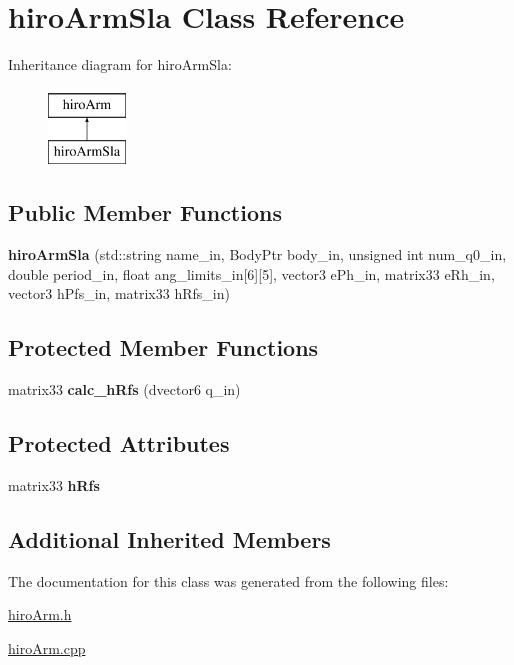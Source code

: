 \hypertarget{classhiroArmSla}{\section{hiro\-Arm\-Sla Class Reference}
\label{classhiroArmSla}
}
Inheritance diagram for hiro\-Arm\-Sla\-:\begin{figure}[H]
\begin{center}
\leavevmode
\includegraphics[height=2.000000cm]{classhiroArmSla}
\end{center}
\end{figure}
\subsection*{Public Member Functions}
\begin{DoxyCompactItemize}
\item 
\hypertarget{classhiroArmSla_a888535be8209d2d22dcc06147e29f6c2}{{\bfseries hiro\-Arm\-Sla} (std\-::string name\-\_\-in, Body\-Ptr body\-\_\-in, unsigned int num\-\_\-q0\-\_\-in, double period\-\_\-in, float ang\-\_\-limits\-\_\-in\mbox{[}6\mbox{]}\mbox{[}5\mbox{]}, vector3 e\-Ph\-\_\-in, matrix33 e\-Rh\-\_\-in, vector3 h\-Pfs\-\_\-in, matrix33 h\-Rfs\-\_\-in)}\label{classhiroArmSla_a888535be8209d2d22dcc06147e29f6c2}

\end{DoxyCompactItemize}
\subsection*{Protected Member Functions}
\begin{DoxyCompactItemize}
\item 
\hypertarget{classhiroArmSla_a5ea00712a02f096e568af6eadcdd51e9}{matrix33 {\bfseries calc\-\_\-h\-Rfs} (dvector6 q\-\_\-in)}\label{classhiroArmSla_a5ea00712a02f096e568af6eadcdd51e9}

\end{DoxyCompactItemize}
\subsection*{Protected Attributes}
\begin{DoxyCompactItemize}
\item 
\hypertarget{classhiroArmSla_aab7a8ab7ff319848bb35193668f76d6e}{matrix33 {\bfseries h\-Rfs}}\label{classhiroArmSla_aab7a8ab7ff319848bb35193668f76d6e}

\end{DoxyCompactItemize}
\subsection*{Additional Inherited Members}


The documentation for this class was generated from the following files\-:\begin{DoxyCompactItemize}
\item 
\hyperlink{hiroArm_8h}{hiro\-Arm.\-h}\item 
\hyperlink{hiroArm_8cpp}{hiro\-Arm.\-cpp}\end{DoxyCompactItemize}
